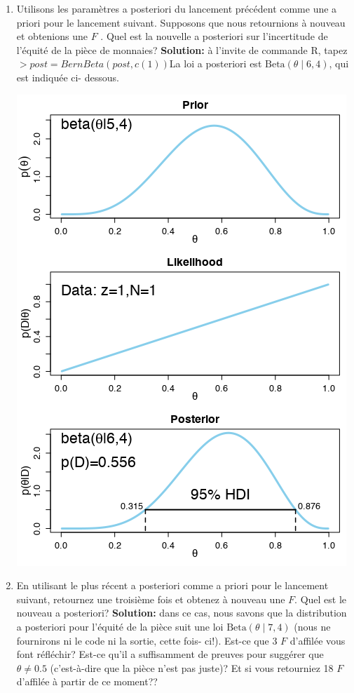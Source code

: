 \begin{Exemple}
\begin{enumerate}[label=(\alph*)]
\item Utilisons les paramètres a posteriori du lancement précédent comme une a priori pour le lancement suivant. Supposons que nous retournions à nouveau et obtenions une $F$ . Quel est la nouvelle a posteriori sur l'incertitude de l'équité de la pièce de monnaies? \newl \textbf{Solution:} à l'invite de commande R, tapez
\newl \small \texttt{$> post = BernBeta(post , c(1))$}\normalsize\newl La loi a posteriori est  $\text{Beta}(\theta\mid 6,4)$, qui est indiquée ci- dessous. 
\begin{center}
	\includegraphics[width=\linewidth]{Images/example51b.png}
	\end{center} 
\item En utilisant le plus récent a posteriori comme a priori pour le lancement suivant, retournez une troisième fois et obtenez à nouveau une $F$. Quel est le nouveau a posteriori? \newl \textbf{Solution:} dans ce cas, nous savons que la distribution a posteriori pour l'équité de la pièce suit une loi  $\text{Beta}(\theta \mid 7,4)$ (nous ne fournirons ni le code ni la sortie, cette fois- ci!). Est-ce que 3 $F$ d'affilée vous font réfléchir? Est-ce qu'il a suffisamment de preuves pour suggérer que $\theta\neq 0.5$ (c'est-à-dire que la pièce n'est pas juste)? Et si vous retourniez 18 $F$ d'affilée à partir de ce moment?? 
\end{enumerate}
\label{ex4}
\end{Exemple} 
